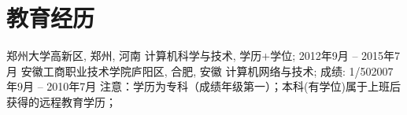 \section{\textbf{教育经历}}
  \resumeSubHeadingListStart
    \resumeSubheading
      {郑州大学}{高新区, 郑州, 河南}
      {计算机科学与技术, 学历+学位; }{2012年9月 -- 2015年7月}
    \resumeSubheading
      {安徽工商职业技术学院}{庐阳区, 合肥, 安徽}
      {计算机网络与技术; 成绩: 1/50}{2007年9月 -- 2010年7月}
  \resumeSubHeadingListEnd
  \noindent\scriptsize 注意：学历为专科（成绩年级第一）；本科(有学位)属于上班后获得的远程教育学历；
  \normalsize